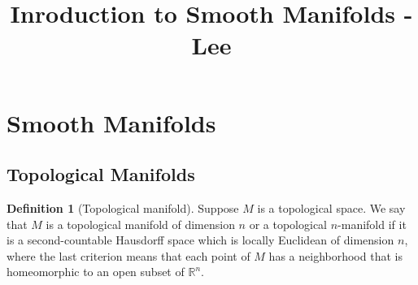 \documentclass[reqno]{amsart}
\title{Inroduction to Smooth Manifolds - Lee}
\date{}
\theoremstyle{plain}%
\theoremstyle{definition}
\newtheorem{definition}[theorem]{Definition}
\theoremstyle{remark}
\begin{document}
\maketitle
\section{Smooth Manifolds}

    \subsection{Topological Manifolds}
        \begin{definition}[Topological manifold]
            Suppose $M$ is a topological space. We say that $M$ is a topological 
            manifold of dimension $n$ or a topological $n$-manifold if it is
            a second-countable Hausdorff space which is locally Euclidean of
            dimension $n$, where the last criterion means that
            each point of $M$ has a neighborhood that is homeomorphic to an open subset of
            $\mathbb{R}^{n}$.
        \end{definition}
\end{document}
